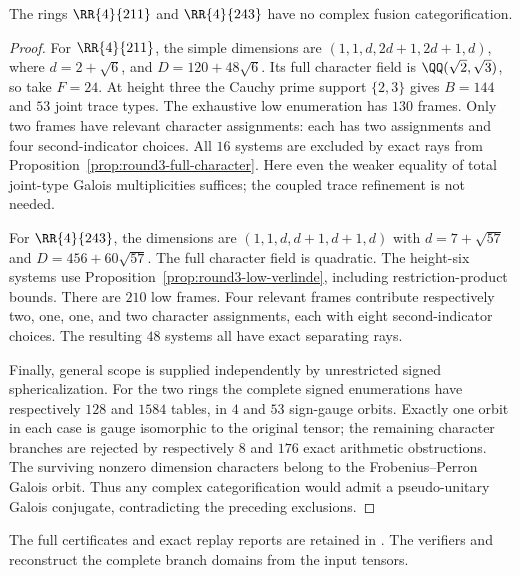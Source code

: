 \begin{theorem}\label{thm:round3-m4-211-243}
The rings $\RR{4}{211}$ and $\RR{4}{243}$ have no complex fusion
categorification.
\end{theorem}
\begin{proof}
For $\RR{4}{211}$, the simple dimensions are
$(1,1,d,2d+1,2d+1,d)$, where $d=2+\sqrt6$, and
$D=120+48\sqrt6$.  Its full character field is
$\QQ(\sqrt2,\sqrt3)$, so take $F=24$.  At height three the Cauchy
prime support $\{2,3\}$ gives $B=144$ and $53$ joint trace types.
The exhaustive low enumeration has $130$ frames.  Only two frames
have relevant character assignments: each has two assignments and
four second-indicator choices.  All $16$ systems are excluded by
exact rays from Proposition~\ref{prop:round3-full-character}.
Here even the weaker equality of total joint-type Galois
multiplicities suffices; the coupled trace refinement is not needed.

For $\RR{4}{243}$, the dimensions are $(1,1,d,d+1,d+1,d)$ with
$d=7+\sqrt{57}$ and $D=456+60\sqrt{57}$.  The full character field is
quadratic.  The height-six systems use
Proposition~\ref{prop:round3-low-verlinde}, including restriction-product
bounds.  There are $210$ low frames.  Four relevant frames contribute
respectively two, one, one, and two character assignments, each with
eight second-indicator choices.  The resulting $48$ systems all have
exact separating rays.

Finally, general scope is supplied independently by unrestricted
signed sphericalization.  For the two rings the complete signed
enumerations have respectively $128$ and $1584$ tables, in $4$ and
$53$ sign-gauge orbits.  Exactly one orbit in each case is gauge
isomorphic to the original tensor; the remaining character branches
are rejected by respectively $8$ and $176$ exact arithmetic
obstructions.  The surviving nonzero dimension characters belong to
the Frobenius--Perron Galois orbit.  Thus any complex categorification would admit a pseudo-unitary
Galois conjugate, contradicting the preceding exclusions.
\end{proof}

The full certificates and exact replay reports are retained in
.  The verifiers
 and
 reconstruct the complete branch
domains from the input tensors.

